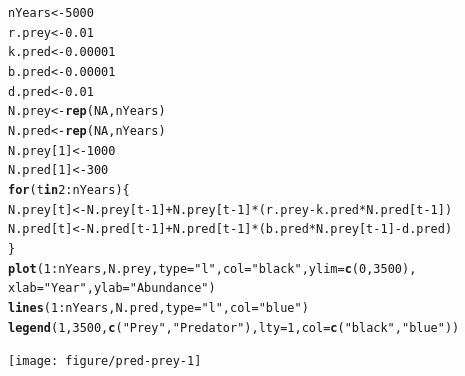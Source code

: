 \documentclass[12pt]{article}\usepackage[]{graphicx}\usepackage[]{xcolor}
\makeatletter
\newcommand{\hlnum}[1]{\textcolor[rgb]{0.686,0.059,0.569}{#1}}%
\newcommand{\hlstr}[1]{\textcolor[rgb]{0.192,0.494,0.8}{#1}}%
\newcommand{\hlopt}[1]{\textcolor[rgb]{0,0,0}{#1}}%
\newcommand{\hlstd}[1]{\textcolor[rgb]{0.345,0.345,0.345}{#1}}%
\newcommand{\hlkwa}[1]{\textcolor[rgb]{0.161,0.373,0.58}{\textbf{#1}}}%
\newcommand{\hlkwb}[1]{\textcolor[rgb]{0.69,0.353,0.396}{#1}}%
\newcommand{\hlkwc}[1]{\textcolor[rgb]{0.333,0.667,0.333}{#1}}%
\newcommand{\hlkwd}[1]{\textcolor[rgb]{0.737,0.353,0.396}{\textbf{#1}}}%
\newenvironment{kframe}{%
 \def\at@end@of@kframe{}%
 \ifinner\ifhmode%
  \def\at@end@of@kframe{\end{minipage}}%
  \begin{minipage}{\columnwidth}%
 \fi\fi%
 \def\FrameCommand##1{\hskip\@totalleftmargin \hskip-\fboxsep
 \colorbox{shadecolor}{##1}\hskip-\fboxsep
     \hskip-\linewidth \hskip-\@totalleftmargin \hskip\columnwidth}%
 \MakeFramed {\advance\hsize-\width
   \@totalleftmargin\z@ \linewidth\hsize
   \@setminipage}}%
 {\par\unskip\endMakeFramed%
 \at@end@of@kframe}
\newenvironment{knitrout}{}{} %
\makeatother
\begin{document}
\begin{knitrout}
\color{fgcolor}\begin{kframe}
\begin{alltt}
\hlstd{nYears} \hlkwb{<-} \hlnum{5000}
\hlstd{r.prey} \hlkwb{<-} \hlnum{0.01}
\hlstd{k.pred} \hlkwb{<-} \hlnum{0.00001}
\hlstd{b.pred} \hlkwb{<-} \hlnum{0.00001}
\hlstd{d.pred} \hlkwb{<-} \hlnum{0.01}
\hlstd{N.prey} \hlkwb{<-} \hlkwd{rep}\hlstd{(}\hlnum{NA}\hlstd{, nYears)}
\hlstd{N.pred} \hlkwb{<-} \hlkwd{rep}\hlstd{(}\hlnum{NA}\hlstd{, nYears)}
\hlstd{N.prey[}\hlnum{1}\hlstd{]} \hlkwb{<-} \hlnum{1000}
\hlstd{N.pred[}\hlnum{1}\hlstd{]} \hlkwb{<-} \hlnum{300}
\hlkwa{for}\hlstd{(t} \hlkwa{in} \hlnum{2}\hlopt{:}\hlstd{nYears) \{}
    \hlstd{N.prey[t]} \hlkwb{<-} \hlstd{N.prey[t}\hlopt{-}\hlnum{1}\hlstd{]} \hlopt{+} \hlstd{N.prey[t}\hlopt{-}\hlnum{1}\hlstd{]}\hlopt{*}\hlstd{(r.prey}\hlopt{-}\hlstd{k.pred}\hlopt{*}\hlstd{N.pred[t}\hlopt{-}\hlnum{1}\hlstd{])}
    \hlstd{N.pred[t]} \hlkwb{<-} \hlstd{N.pred[t}\hlopt{-}\hlnum{1}\hlstd{]} \hlopt{+} \hlstd{N.pred[t}\hlopt{-}\hlnum{1}\hlstd{]}\hlopt{*}\hlstd{(b.pred}\hlopt{*}\hlstd{N.prey[t}\hlopt{-}\hlnum{1}\hlstd{]} \hlopt{-} \hlstd{d.pred)}
\hlstd{\}}
\hlkwd{plot}\hlstd{(}\hlnum{1}\hlopt{:}\hlstd{nYears, N.prey,} \hlkwc{type}\hlstd{=}\hlstr{"l"}\hlstd{,} \hlkwc{col}\hlstd{=}\hlstr{"black"}\hlstd{,} \hlkwc{ylim}\hlstd{=}\hlkwd{c}\hlstd{(}\hlnum{0}\hlstd{,} \hlnum{3500}\hlstd{),}
     \hlkwc{xlab}\hlstd{=}\hlstr{"Year"}\hlstd{,} \hlkwc{ylab}\hlstd{=}\hlstr{"Abundance"}\hlstd{)}
\hlkwd{lines}\hlstd{(}\hlnum{1}\hlopt{:}\hlstd{nYears, N.pred,} \hlkwc{type}\hlstd{=}\hlstr{"l"}\hlstd{,} \hlkwc{col}\hlstd{=}\hlstr{"blue"}\hlstd{)}
\hlkwd{legend}\hlstd{(}\hlnum{1}\hlstd{,} \hlnum{3500}\hlstd{,} \hlkwd{c}\hlstd{(}\hlstr{"Prey"}\hlstd{,} \hlstr{"Predator"}\hlstd{),} \hlkwc{lty}\hlstd{=}\hlnum{1}\hlstd{,} \hlkwc{col}\hlstd{=}\hlkwd{c}\hlstd{(}\hlstr{"black"}\hlstd{,} \hlstr{"blue"}\hlstd{))}
\end{alltt}
\end{kframe}

{\centering \texttt{[image: figure/pred-prey-1]} 

}


\end{knitrout}
\end{document}
